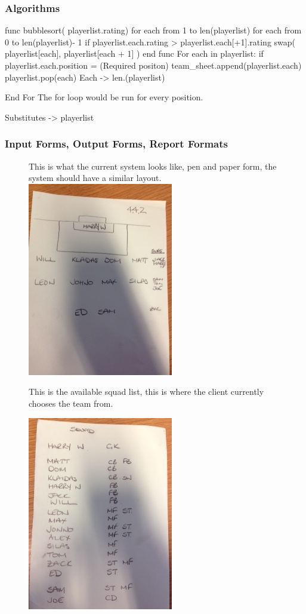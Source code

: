 \subsubsection{Algorithms}

func bubblesort( playerlist.rating)
    for each from 1 to len(playerlist)
        for each from 0 to  len(playerlist)- 1
           if playerlist.each.rating > playerlist.each[+1].rating
              swap( playerlist[each], playerlist[each + 1] )
end func
For each in playerlist:
	if playerlist.each.position = (Required positon)\:
		team\_sheet.append(playerlist.each)
		playerlist.pop(each)
		Each -> len.(playerlist)
		
	
End For
The for loop would be run for every position.

Substitutes ->  playerlist 

\subsubsection{Input Forms, Output Forms, Report Formats}
\begin{figure}[H]
	This is what the current system looks like, pen and paper form, the system should have a similar layout.
	\includegraphics{formation}
	
	
	This is the available squad list, this is where the client currently chooses the team from. 

	\includegraphics{squad}
\end{figure}

